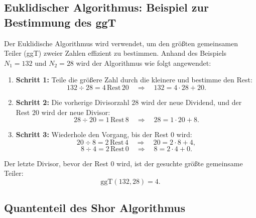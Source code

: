 \subsection{Euklidischer Algorithmus: Beispiel zur Bestimmung des ggT}

Der Euklidische Algorithmus wird verwendet, um den größten gemeinsamen 
Teiler (ggT) zweier Zahlen effizient zu bestimmen. Anhand des Beispiels 
$N_1 = 132$ und $N_2 = 28$ wird der Algorithmus wie folgt angewendet:

\begin{enumerate}
    \item \textbf{Schritt 1:}  
    Teile die größere Zahl durch die kleinere und bestimme den Rest:  
    \[
    132 \div 28 = 4 \, \text{Rest} \, 20 \quad \Rightarrow \quad 132 = 4 \cdot 28 + 20.
    \]

    \item \textbf{Schritt 2:}  
    Die vorherige Divisorzahl $28$ wird der neue Dividend, und der Rest $20$ wird der neue Divisor:  
    \[
    28 \div 20 = 1 \, \text{Rest} \, 8 \quad \Rightarrow \quad 28 = 1 \cdot 20 + 8.
    \]

    \item \textbf{Schritt 3:}  
    Wiederhole den Vorgang, bis der Rest $0$ wird:  
    \[
    20 \div 8 = 2 \, \text{Rest} \, 4 \quad \Rightarrow \quad 20 = 2 \cdot 8 + 4,
    \]  
    \[
    8 \div 4 = 2 \, \text{Rest} \, 0 \quad \Rightarrow \quad 8 = 2 \cdot 4 + 0.
    \]
\end{enumerate}

Der letzte Divisor, bevor der Rest $0$ wird, ist der gesuchte größte gemeinsame Teiler:  
\[
\text{ggT}(132, 28) = 4.
\]

\subsection{Quantenteil des Shor Algorithmus}
